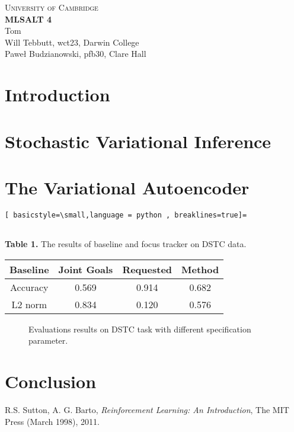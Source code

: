 \documentclass[10pt,a4paper]{article}
\begin{document}
\begin{center}
\Large{\textsc{
University of Cambridge}}\\
\vspace{.5cm}
\large\textbf{MLSALT 4}\\
\vspace{.5cm}
\large{Tom}\\
\large{Will Tebbutt, wct23, Darwin College}\\
\large{Paweł Budzianowski, pfb30, Clare Hall}\\
\end{center} 

\section{Introduction}


\section{Stochastic Variational Inference}


\section{The Variational Autoencoder}



\begin{lstlisting}[ basicstyle=\small,language = python , breaklines=true]=


\end{lstlisting}



 {\small \textbf{Table 1.} The results of baseline and focus tracker on DSTC data.}
\begin{center}
\begin{tabular}{c | c c c} \label{tab1}
Baseline &  Joint Goals & Requested & Method \\ \hline 
Accuracy & 0.569 & 0.914 & 0.682\\
L2 norm & 0.834  & 0.120& 0.576\\
\end{tabular} 
\end{center}

\begin{figure}[!htb]
%
\endminipage 
{}  
\endminipage\hfill
  \caption[1]{Evaluations results on DSTC task with different specification parameter.}
\end{figure}

\section{Conclusion}


\begin{thebibliography}{15}
 R.S. Sutton, A. G. Barto, \emph{Reinforcement Learning: An Introduction}, The MIT Press (March 1998), 2011.


\end{thebibliography}
\end{document}
